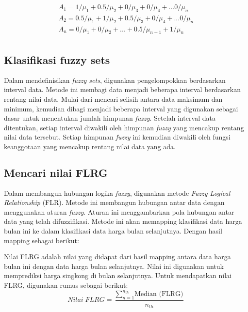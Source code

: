 \documentclass[conference]{IEEEtran}
\begin{document}
\begin{equation}
\label{eq:1}
\begin{aligned}
    {A_1} = 1/{\mu_1} + 0.5/{\mu_2} + 0/{\mu_3} + 0/{\mu_4} + ... 0/{\mu_n} \\
    {A_2} = 0.5/{\mu_1} + 1/{\mu_2} + 0.5/{\mu_3} + 0/{\mu_4} + ... 0/{\mu_n} \\
    {A_n} = 0/{\mu_1} + 0/{\mu_2} + ... + 0.5/{\mu_{n-1}} + 1/{\mu_n} \\
\end{aligned}
\end{equation}

   



\subsection{Klasifikasi fuzzy sets}
Dalam mendefinisikan \textit{fuzzy sets}, digunakan pengelompokkan berdasarkan interval data. Metode ini membagi data menjadi beberapa interval berdasarkan rentang nilai data. Mulai dari mencari selisih antara data maksimum dan minimum, kemudian dibagi menjadi beberapa interval yang digunakan sebagai dasar untuk menentukan jumlah himpunan \textit{fuzzy}. Setelah interval data ditentukan, setiap interval diwakili oleh himpunan \textit{fuzzy} yang mencakup rentang nilai data tersebut. Setiap himpunan \textit{fuzzy} ini kemudian diwakili oleh fungsi keanggotaan yang mencakup rentang nilai data yang ada.


\subsection{Mencari nilai FLRG}
Dalam membangun hubungan logika \textit{fuzzy}, digunakan metode \textit{Fuzzy Logical Relationship} (FLR). Metode ini membangun hubungan antar data dengan menggunakan aturan \textit{fuzzy}. Aturan ini menggambarkan pola hubungan antar data yang telah difuzzifikasi. Metode ini akan memapping klasifikasi data harga bulan ini ke dalam klasifikasi data harga bulan selanjutnya. Dengan hasil mapping sebagai berikut:

Nilai FLRG adalah nilai yang didapat dari hasil mapping antara data harga bulan ini dengan data harga bulan selanjutnya. Nilai ini digunakan untuk memprediksi harga singkong di bulan selanjutnya.
Untuk mendapatkan nilai FLRG, digunakan rumus sebagai berikut:
\begin{equation}
    Nilai\; FLRG = \frac{\sum_{n=1}^{n_{th}} \text{Median (FLRG)}}{n_{th}}
\end{equation}
    
\end{document}
